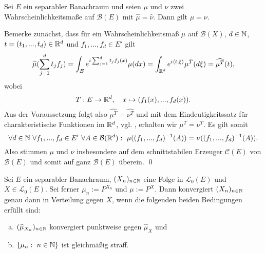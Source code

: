 \begin{theorem}[Eindeutigkeitssatz]
    Sei $E$ ein separabler Banachraum und seien $\mu$ und $\nu$ zwei Wahrscheinlichkeitsmaße auf $\mathcal{B}(E)$ mit $\widehat{\mu} = \widehat{\nu}$. Dann gilt $\mu = \nu$.
\end{theorem}

\begin{proof*}
    Bemerke zunächst, dass für ein Wahrscheinlichkeitsmaß $\mu$ auf $\mathcal{B}(X)$, $d \in  \mathbb{N}$, $t=(t_1,...,t_d) \in \mathbb{R}^d$ und $f_1,..., f_d \in E'$ gilt
    $$
        \widehat{\mu}(\sum_{j=1}^d t_j f_j) = \int_E e^{i\sum_{j=1}^dt_jf_j(x)}\mu(dx) = \int_{\mathbb{R}^d} e^{i\langle t, \xi \rangle}\mu^T(d\xi) = \widehat{\mu^T}(t),
    $$
    wobei 
    $$
        T: E \to \mathbb{R}^d, \quad x \mapsto (f_1(x),...,f_d(x)). 
    $$
    Aus der Voraussetzung folgt also $\widehat{\mu^T} = \widehat{\nu^T}$ und mit dem Eindeutigkeitssatz für charakteristische Funktionen im $\mathbb{R}^d$, vgl. \cite[Satz 8.7.1]{gs}, erhalten wir $\mu^T = \nu^T$. 
    Es gilt somit
    $$
        \forall d\in \N \ \forall f_1,...,f_d \in E' \ \forall A \in \mathcal{B}(\R^d): \ \mu((f_1,...,f_d)^{-1}(A)) =  \nu((f_1,...,f_d)^{-1}(A)). 
    $$
    Also stimmen $\mu$ und $\nu$ insbesondere auf dem schnittstabilen Erzeuger $\mathcal{C}(E)$ von $\mathcal{B}(E)$ und somit auf ganz $\mathcal{B}(E)$ überein. \qed
\end{proof*}

\begin{theorem}
    Sei  $E$ ein separabler Banachraum, $(X_n)_{n \in \mathbb{N}}$ eine Folge in $\mathcal{L}_0(E)$ und $X \in \mathcal{L}_0(E)$. Sei ferner $\mu_n := P^{X_n}$ und $\mu := P^X$.   
    Dann konvergiert $(X_n)_{n \in \mathbb{N}}$ genau dann in Verteilung gegen $X$, wenn die folgenden beiden Bedingungen erfüllt sind:
    \begin{enumerate}[(a)]
        \item $(\widehat{\mu}_{X_n})_{n \in \mathbb{N}}$ konvergiert punktweise gegen $\widehat{\mu}_X$ und
        \item $\{\mu_n: \ n \in \mathbb{N} \}$ ist gleichmäßig straff. 
    \end{enumerate}
\end{theorem}

